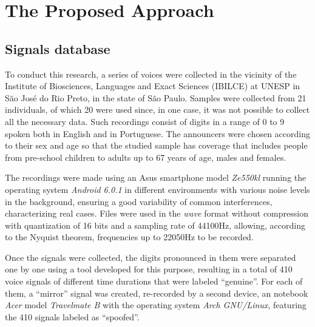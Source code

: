\section{The Proposed Approach}
	\label{sec:propApproach}
	\subsection{Signals database}
		\par To conduct this research, a series of voices were collected in the vicinity of the Institute of Biosciences, Languages and Exact Sciences (IBILCE) at UNESP in São José do Rio Preto, in the state of São Paulo. Samples were collected from 21 individuals, of which 20 were used since, in one case, it was not possible to collect all the necessary data. Such recordings consist of digits in a range of 0 to 9 spoken both in English and in Portuguese. The announcers were chosen according to their sex and age so that the studied sample has coverage that includes people from pre-school children to adults up to 67 years of age, males and females.
		
		\par The recordings were made using an Asus smartphone model \textit{Ze550kl} running the operating system \textit{Android 6.0.1} in different environments with various noise levels in the background, ensuring a good variability of common interferences, characterizing real cases. Files were used in the \textit{wave} format without compression with quantization of 16 bits and a sampling rate of 44100Hz, allowing, according to the Nyquist theorem, frequencies up to 22050Hz to be recorded.
		
		\par Once the signals were collected, the digits pronounced in them were separated one by one using a tool developed for this purpose, resulting in a total of 410 voice signals of different time durations that were labeled ``genuine''. For each of them, a ``mirror'' signal was created, re-recorded by a second device, an notebook \textit{Acer} model \textit{Travelmate B} with the operating system \textit{Arch GNU/Linux}, featuring the 410 signals labeled as  ``spoofed''.
		
